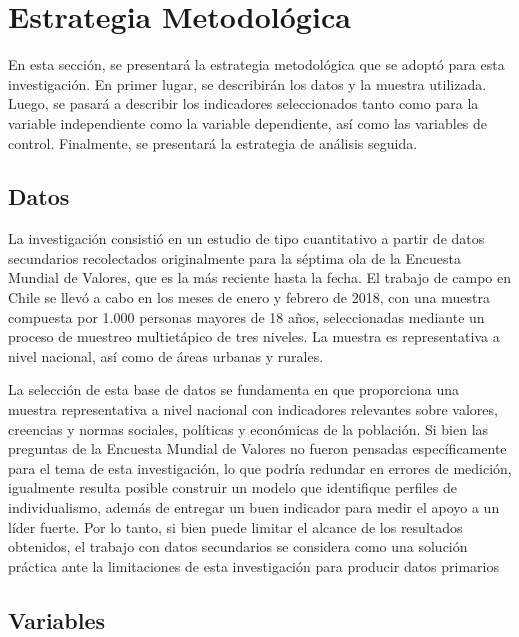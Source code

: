 \documentclass[
  letterpaper,
  DIV=11,
  numbers=noendperiod]{scrartcl}
\begin{document}
\FloatBarrier

\section*{Estrategia Metodológica}\label{estrategia-metodoluxf3gica}

En esta sección, se presentará la estrategia metodológica que se adoptó
para esta investigación. En primer lugar, se describirán los datos y la
muestra utilizada. Luego, se pasará a describir los indicadores
seleccionados tanto como para la variable independiente como la variable
dependiente, así como las variables de control. Finalmente, se
presentará la estrategia de análisis seguida.

\subsection*{Datos}\label{datos}

La investigación consistió en un estudio de tipo cuantitativo a partir
de datos secundarios recolectados originalmente para la séptima ola de
la Encuesta Mundial de Valores, que es la más reciente hasta la fecha.
El trabajo de campo en Chile se llevó a cabo en los meses de enero y
febrero de 2018, con una muestra compuesta por 1.000 personas mayores de
18 años, seleccionadas mediante un proceso de muestreo multietápico de
tres niveles. La muestra es representativa a nivel nacional, así como de
áreas urbanas y rurales.

La selección de esta base de datos se fundamenta en que proporciona una
muestra representativa a nivel nacional con indicadores relevantes sobre
valores, creencias y normas sociales, políticas y económicas de la
población. Si bien las preguntas de la Encuesta Mundial de Valores no
fueron pensadas específicamente para el tema de esta investigación, lo
que podría redundar en errores de medición, igualmente resulta posible
construir un modelo que identifique perfiles de individualismo, además
de entregar un buen indicador para medir el apoyo a un líder fuerte. Por
lo tanto, si bien puede limitar el alcance de los resultados obtenidos,
el trabajo con datos secundarios se considera como una solución práctica
ante la limitaciones de esta investigación para producir datos primarios

\FloatBarrier

\subsection*{Variables}\label{variables}
\end{document}
